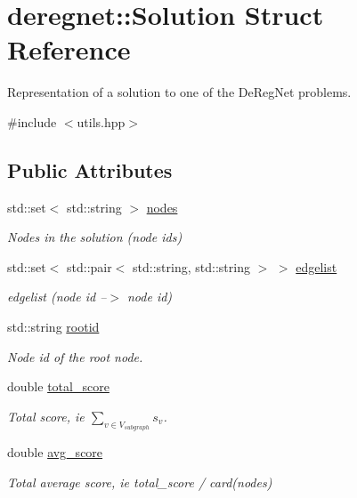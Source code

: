 \hypertarget{structderegnet_1_1Solution}{}\section{deregnet\+:\+:Solution Struct Reference}
\label{structderegnet_1_1Solution}


Representation of a solution to one of the De\+Reg\+Net problems.  




{\ttfamily \#include $<$utils.\+hpp$>$}

\subsection*{Public Attributes}
\begin{DoxyCompactItemize}
\item 
std\+::set$<$ std\+::string $>$ \hyperlink{structderegnet_1_1Solution_a581de4de354d10149c7b9c0816c70840}{nodes}
\begin{DoxyCompactList}\small\item\em Nodes in the solution (node id\textquotesingle{}s) \end{DoxyCompactList}\item 
std\+::set$<$ std\+::pair$<$ std\+::string, std\+::string $>$ $>$ \hyperlink{structderegnet_1_1Solution_aa4dcc94d51fa7e4e9443263572d8b18d}{edgelist}
\begin{DoxyCompactList}\small\item\em edgelist (node id --$>$ node id) \end{DoxyCompactList}\item 
std\+::string \hyperlink{structderegnet_1_1Solution_a1aca697c0ec5e039837094cb45731215}{rootid}
\begin{DoxyCompactList}\small\item\em Node id of the root node. \end{DoxyCompactList}\item 
double \hyperlink{structderegnet_1_1Solution_af2e4901767f70d22b41acafa8cfb62d2}{total\+\_\+score}
\begin{DoxyCompactList}\small\item\em Total score, ie $\displaystyle \sum_{v \in V_{subgraph}} s_v $. \end{DoxyCompactList}\item 
double \hyperlink{structderegnet_1_1Solution_a9282be3934d49183f8b5304130ee07c7}{avg\+\_\+score}
\begin{DoxyCompactList}\small\item\em Total average score, ie total\+\_\+score / card(nodes) \end{DoxyCompactList}\end{DoxyCompactItemize}


